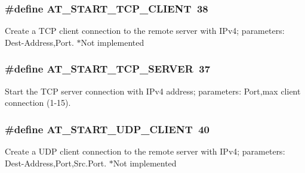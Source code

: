 \subsubsection[{\texorpdfstring{A\+T\+\_\+\+S\+T\+A\+R\+T\+\_\+\+T\+C\+P\+\_\+\+C\+L\+I\+E\+NT}{AT_START_TCP_CLIENT}}]{\setlength{\rightskip}{0pt plus 5cm}\#define A\+T\+\_\+\+S\+T\+A\+R\+T\+\_\+\+T\+C\+P\+\_\+\+C\+L\+I\+E\+NT~38}\hypertarget{group__wireless__interface_ga647223879f11c1980a9ff63907b0c815}{}\label{group__wireless__interface_ga647223879f11c1980a9ff63907b0c815}
Create a T\+CP client connection to the remote server with I\+Pv4; parameters\+: Dest-\/\+Address,Port. $\ast$\+Not implemented 
\subsubsection[{\texorpdfstring{A\+T\+\_\+\+S\+T\+A\+R\+T\+\_\+\+T\+C\+P\+\_\+\+S\+E\+R\+V\+ER}{AT_START_TCP_SERVER}}]{\setlength{\rightskip}{0pt plus 5cm}\#define A\+T\+\_\+\+S\+T\+A\+R\+T\+\_\+\+T\+C\+P\+\_\+\+S\+E\+R\+V\+ER~37}\hypertarget{group__wireless__interface_ga80aa971012d6042326c6c4a29ce6f70f}{}\label{group__wireless__interface_ga80aa971012d6042326c6c4a29ce6f70f}
Start the T\+CP server connection with I\+Pv4 address; parameters\+: Port,max client connection (1-\/15). 
\subsubsection[{\texorpdfstring{A\+T\+\_\+\+S\+T\+A\+R\+T\+\_\+\+U\+D\+P\+\_\+\+C\+L\+I\+E\+NT}{AT_START_UDP_CLIENT}}]{\setlength{\rightskip}{0pt plus 5cm}\#define A\+T\+\_\+\+S\+T\+A\+R\+T\+\_\+\+U\+D\+P\+\_\+\+C\+L\+I\+E\+NT~40}\hypertarget{group__wireless__interface_ga8d28542a331e37312330c1eb2332c18e}{}\label{group__wireless__interface_ga8d28542a331e37312330c1eb2332c18e}
Create a U\+DP client connection to the remote server with I\+Pv4; parameters\+: Dest-\/\+Address,Port,Src.\+Port. $\ast$\+Not implemented 
